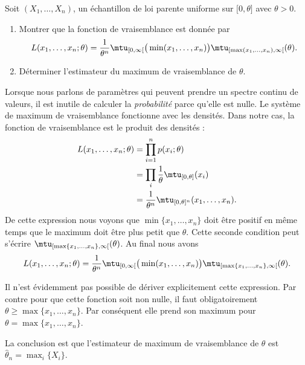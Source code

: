 \begin{example}

	Soit \( (X_1,\ldots,X_n)\), un échantillon de loi parente uniforme sur \( \mathopen[ 0 , \theta \mathclose]\) avec \( \theta>0\).

	\begin{enumerate}
		\item
		      Montrer que la fonction de vraisemblance est donnée par
		      \begin{equation}
			      L(x_1,\ldots,x_n;\theta)=\frac{1}{ \theta^n }\mtu_{\mathopen[ 0 , \infty [}\big( \min(x_1,\ldots,x_n) \big)\mtu_{\mathopen[ \max(x_1,\ldots,x_n) , \infty [}(\theta).
		      \end{equation}

		\item
		      Déterminer l'estimateur du maximum de vraisemblance de \( \theta\).
	\end{enumerate}


	Lorsque nous parlons de paramètres qui peuvent prendre un spectre continu de valeurs, il est inutile de calculer la \emph{probabilité} parce qu'elle est nulle. Le système de maximum de vraisemblance fonctionne avec les densités. Dans notre cas, la fonction de vraisemblance est le produit des densités :
	\begin{subequations}
		\begin{align}
			L(x_1,\ldots,x_n;\theta) & =\prod_{i=1}^np(x_i;\theta)                                                      \\
			                         & =\prod_i\frac{1}{ \theta }\mtu_{\mathopen[ 0, \theta \mathclose]}(x_i)           \\
			                         & =\frac{1}{ \theta^n }\mtu_{\mathopen[ 0 , \theta \mathclose]^n}(x_1,\ldots,x_n).
		\end{align}
	\end{subequations}
	De cette expression nous voyons que \( \min\{ x_1,\ldots,x_n \}\) doit être positif en même temps que le maximum doit être plus petit que \( \theta\). Cette seconde condition peut s'écrire \( \mtu_{\mathopen[ \max\{ x_1,\ldots,x_n \} , \infty [}(\theta)\). Au final nous avons
	\begin{equation}
		L(x_1,\ldots,x_n;\theta)=\frac{1}{ \theta^n }\mtu_{\mathopen[ 0 , \infty [}\big( \min(x_1,\ldots,x_n) \big)\mtu_{\mathopen[ \max\{ x_1,\ldots,x_n \} , \infty [}(\theta).
	\end{equation}

	Il n'est évidemment pas possible de dériver explicitement cette expression. Par contre pour que cette fonction soit non nulle, il faut obligatoirement \( \theta\geq\max\{ x_1,\ldots,x_n \}\). Par conséquent elle prend son maximum pour \( \theta=\max\{ x_1,\ldots,x_n \}\).

	La conclusion est que l'estimateur de maximum de vraisemblance de \( \theta\) est \( \hat\theta_n=\max_i\{ X_i \}\).
\end{example}

